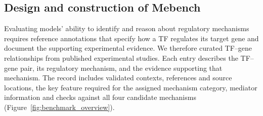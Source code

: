 \subsection{Design and construction of Mebench}
Evaluating models’ ability to identify and reason about regulatory mechanisms requires reference annotations that specify how a TF regulates its target gene and document the supporting experimental evidence. We therefore curated TF–gene relationships from published experimental studies. Each entry describes the TF–gene pair, its regulatory mechanism, and the evidence supporting that mechanism. The record includes validated contexts, references and source locations, the key feature required for the assigned mechanism category, mediator information and checks against all four candidate mechanisms (Figure~\ref{fig:benchmark_overview}).


